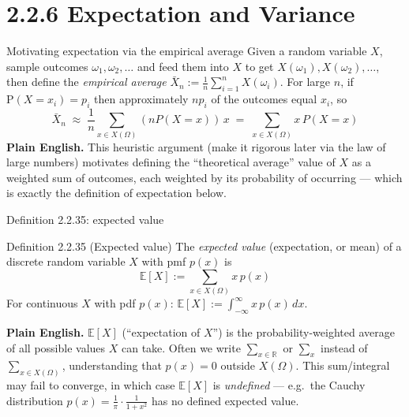 \documentclass[aspectratio=169,10pt]{beamer}
\begin{document}
\section{2.2.6 Expectation and Variance}

\begin{frame}{Motivating expectation via the empirical average}
Given a random variable $X$, sample outcomes $\omega_1,\omega_2,\ldots$ and
feed them into $X$ to get $X(\omega_1),X(\omega_2),\ldots$, then define the
\emph{empirical average} $\bar{X}_n:=\tfrac1n\sum_{i=1}^{n}X(\omega_i)$. For
large $n$, if $\mathrm{P}(X=x_i)=p_i$ then approximately $np_i$ of the
outcomes equal $x_i$, so
\[ \bar{X}_n \;\approx\; \frac1n\sum_{x\in X(\Omega)}(nP(X=x))\,x \;=\; \sum_{x\in X(\Omega)} x\, P(X=x) \]
\textbf{Plain English.} This heuristic argument (make it rigorous later via
the law of large numbers) motivates defining the ``theoretical average''
value of $X$ as a weighted sum of outcomes, each weighted by its probability
of occurring --- which is exactly the definition of expectation below.
\end{frame}

\begin{frame}{Definition 2.2.35: expected value}
\begin{block}{Definition 2.2.35 (Expected value)}
The \emph{expected value} (expectation, or mean) of a discrete random
variable $X$ with pmf $p(x)$ is
\[ \mathbb{E}[X] := \sum_{x\in X(\Omega)} x\, p(x) \]
For continuous $X$ with pdf $p(x)$: $\mathbb{E}[X] := \int_{-\infty}^{\infty} x\,p(x)\,dx$.
\end{block}
\textbf{Plain English.} $\mathbb{E}[X]$ (``expectation of $X$'') is the
probability-weighted average of all possible values $X$ can take. Often we
write $\sum_{x\in\mathbb{R}}$ or $\sum_x$ instead of $\sum_{x\in X(\Omega)}$,
understanding that $p(x)=0$ outside $X(\Omega)$. This sum/integral may fail
to converge, in which case $\mathbb{E}[X]$ is \emph{undefined} --- e.g.\ the
Cauchy distribution $p(x)=\tfrac1\pi\cdot\tfrac{1}{1+x^2}$ has no defined
expected value.
\end{frame}
\end{document}
